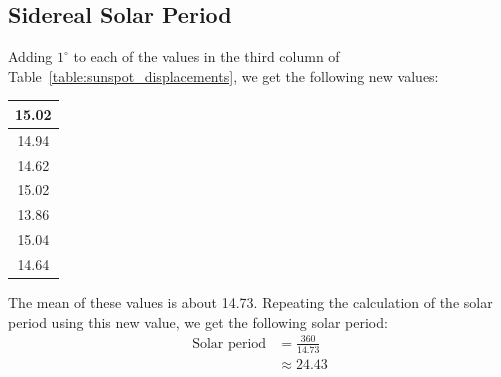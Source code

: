 \documentclass[11pt]{article}
\begin{document}
\subsection{Sidereal Solar Period} \label{sec:sidereal_period}
Adding $1^\circ$ to each of the values in the third column of Table~\ref{table:sunspot_displacements}, we get the following new values:
\newline
\newline
\begin{tabular}{| c |}
	\hline
	15.02\\ \hline
	14.94\\ \hline
	14.62\\ \hline
	15.02\\ \hline
	13.86\\ \hline
	15.04\\ \hline
	14.64\\ \hline
\end{tabular}
\newline
\newline
The mean of these values is about 14.73.
Repeating the calculation of the solar period using this new value, we get the following solar period:
\begin{equation}
\begin{split}
	\textrm{Solar period} &= \frac{360}{14.73}\\
			      &\approx 24.43
\end{split}
\end{equation}
\end{document}

